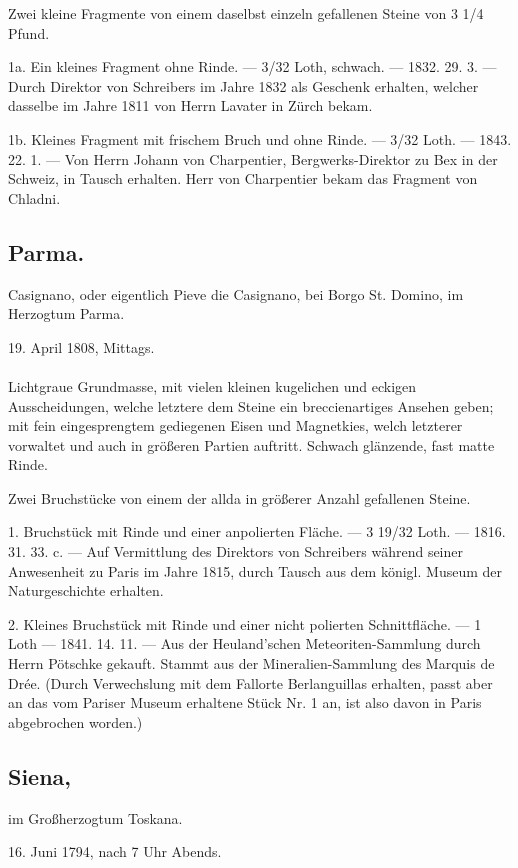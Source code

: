 \documentclass[a4paper, 11pt, oneside, polutonikogreek, german]{article}
\begin{document}
Zwei kleine Fragmente von einem daselbst einzeln gefallenen Steine von 3 1/4 Pfund.

1a. Ein kleines Fragment ohne Rinde. — 3/32 Loth, schwach. — 1832. 29. 3. — Durch Direktor von Schreibers im Jahre 1832 als Geschenk erhalten, welcher dasselbe im Jahre 1811 von Herrn Lavater in Zürch bekam.

1b. Kleines Fragment mit frischem Bruch und ohne Rinde. — 3/32 Loth. — 1843. 22. 1. — Von Herrn Johann von Charpentier, Bergwerks-Direktor zu Bex in der Schweiz, in Tausch erhalten. Herr von Charpentier bekam das Fragment von Chladni.
\subsection{Parma.}
\begin{center}
\small
Casignano, oder eigentlich Pieve die Casignano, bei Borgo St. Domino, im Herzogtum Parma.

19. April 1808, Mittags.
\end{center}
\paragraph{}
Lichtgraue Grundmasse, mit vielen kleinen kugelichen und eckigen Ausscheidungen, welche letztere dem Steine ein breccienartiges Ansehen geben; mit fein eingesprengtem gediegenen Eisen und Magnetkies, welch letzterer vorwaltet und auch in größeren Partien auftritt. Schwach glänzende, fast matte Rinde.

Zwei Bruchstücke von einem der allda in größerer Anzahl gefallenen Steine.

1. Bruchstück mit Rinde und einer anpolierten Fläche. — 3 19/32 Loth. — 1816. 31. 33. c. — Auf Vermittlung des Direktors von Schreibers während seiner Anwesenheit zu Paris im Jahre 1815, durch Tausch aus dem königl. Museum der Naturgeschichte erhalten.

2. Kleines Bruchstück mit Rinde und einer nicht polierten Schnittfläche. — 1 Loth — 1841. 14. 11. — Aus der Heuland'schen Meteoriten-Sammlung durch Herrn Pötschke gekauft. Stammt aus der Mineralien-Sammlung des Marquis de Drée. (Durch Verwechslung mit dem Fallorte Berlanguillas erhalten, passt aber an das vom Pariser Museum erhaltene Stück Nr. 1 an, ist also davon in Paris abgebrochen worden.)
\subsection{Siena,}
\begin{center}
\small
im Großherzogtum Toskana.

16. Juni 1794, nach 7 Uhr Abends.
\end{center}
\end{document}

